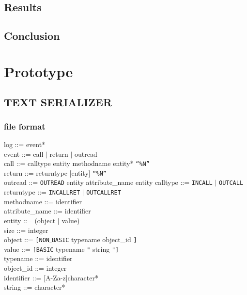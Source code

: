 \documentclass[a4paper,10pt]{article}
\begin{document}
\subsection{Results}
\subsection{Conclusion}



\section{Prototype}

\subsection{TEXT SERIALIZER}

\subsubsection{file format}
log ::= event* \\
event ::= call $\mid$ return $\mid$ outread\\
call ::= calltype entity methodname entity* \texttt{“\%N”} \\
return ::= returntype [entity]  \texttt{“\%N”}\\
outread ::= \texttt{OUTREAD} entity attribute\_name entity
calltype ::= \texttt{INCALL} $\mid$ \texttt{OUTCALL} \\
returntype ::= \texttt{INCALLRET} $\mid$ \texttt{OUTCALLRET} \\
methodname ::= identifier \\
attribute\_name ::= identifier \\
entity ::= (object $\mid$ value) \\
size ::= integer \\
object ::= \texttt{[NON$\_$BASIC} typename object\_id \texttt{]} \\
value ::= \texttt{[BASIC} typename \texttt{"} string \texttt{"]} \\
typename ::= identifier \\
object\_id ::= integer\\
identifier ::= [A-Za-z]character*\\
string ::= character*\\
\end{document}
